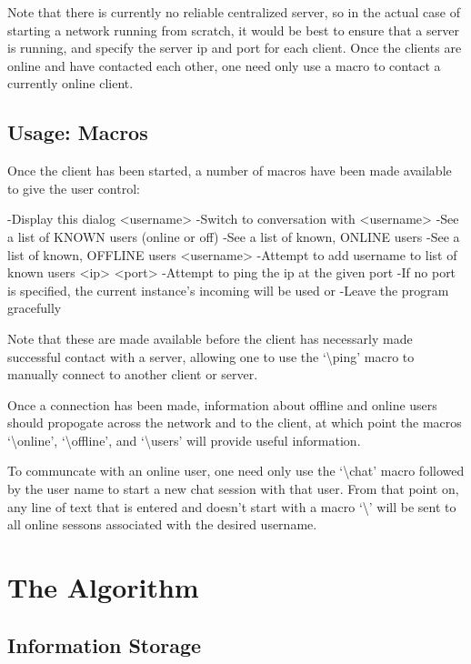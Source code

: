 \documentclass[11pt]{article}
\begin{document}
Note that there is currently no reliable centralized server, so in the actual case of starting a network running from scratch, it would be best to ensure that a server is running, and specify the server ip and port for each client. Once the clients are online and have contacted each other, one need only use a macro to contact a currently online client.

\subsection{Usage: Macros}
Once the client has been started, a number of macros have been made available to give the user control:
\begin{code}
  \help
   -Display this dialog
  \chat <username>
   -Switch to conversation with <username>
  \users
   -See a list of KNOWN users (online or off)
  \online
   -See a list of known, ONLINE users
  \offline
   -See a list of known, OFFLINE users
  \add <username>
   -Attempt to add username to list of known users
  \ping <ip> <port>
  -Attempt to ping the ip at the given port
  -If no port is specified, the current instance's incoming will be used
  \quit or \exit
   -Leave the program gracefully
\end{code}

Note that these are made available before the client has necessarly made successful contact with a server, allowing one to use the `\textbackslash ping' macro to manually connect to another client or server.

Once a connection has been made, information about offline and online users should propogate across the network and to the client, at which point the macros `\textbackslash online', `\textbackslash offline', and `\textbackslash users' will provide useful information. 

To communcate with an online user, one need only use the `\textbackslash chat' macro followed by the user name to start a new chat session with that user. From that point on, any line of text that is entered and doesn't start with a macro `\textbackslash' will be sent to all online sessons associated with the desired username.

\section{The Algorithm}

\subsection{Information Storage}
\end{document}
